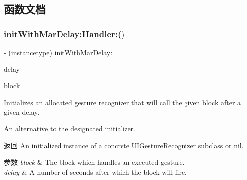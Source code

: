 \subsection{函数文档}
\mbox{\label{category_u_i_gesture_recognizer_07_m_a_r_e_x___block_08_a866bf845d0435b637c6811f4688921ba}} 
\subsubsection{\texorpdfstring{init\+With\+Mar\+Delay\+:\+Handler\+:()}{initWithMarDelay:Handler:()}\hspace{0.1cm}{\footnotesize\ttfamily [1/2]}}
{\footnotesize\ttfamily -\/ (instancetype) init\+With\+Mar\+Delay\+: \begin{DoxyParamCaption}\item[{(N\+S\+Time\+Interval)}]{delay }\item[{Handler:(void($^\wedge$)(U\+I\+Gesture\+Recognizer $\ast$sender, U\+I\+Gesture\+Recognizer\+State state, C\+G\+Point location))}]{block }\end{DoxyParamCaption}}

Initializes an allocated gesture recognizer that will call the given block after a given delay.

An alternative to the designated initializer.

\begin{DoxyReturn}{返回}
An initialized instance of a concrete U\+I\+Gesture\+Recognizer subclass or {\ttfamily nil}. 
\end{DoxyReturn}

\begin{DoxyParams}{参数}
{\em block} & The block which handles an executed gesture. \\
\hline
{\em delay} & A number of seconds after which the block will fire. \\
\hline
\end{DoxyParams}
\mbox{\label{category_u_i_gesture_recognizer_07_m_a_r_e_x___block_08_a369298526d18f78c0546a74da1d59037}} 
